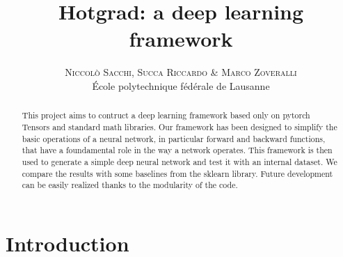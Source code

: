 \documentclass[10pt,conference,compsocconf]{IEEEtran}
\begin{document}
        
\pretitle{\begin{center}\Huge\bfseries} %
\posttitle{\end{center}} %
\title{Hotgrad: a deep learning framework}
\author{
        \textsc{Niccol\`{o} Sacchi, Succa Riccardo \& Marco Zoveralli}
        \normalsize{} \\
        \normalsize \'{E}cole polytechnique f\'{e}d\'{e}rale de Lausanne
}
\maketitle
\begin{abstract}
  This project aims to contruct a deep learning framework based only on pytorch Tensors and standard math libraries. Our framework has been designed to simplify the basic operations of a neural network, in particular forward and backward functions, that have a foundamental role in the way a network operates.
  This framework is then used to generate a simple deep neural network and test it with an internal dataset. We compare the results with some baselines from the sklearn library.
  Future development can be easily realized thanks to the modularity of the code.
\end{abstract}
\section{Introduction}
    
\end{document}
